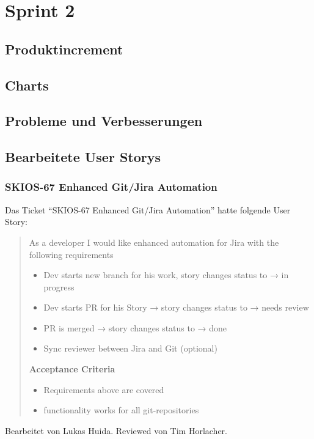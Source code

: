 \section{Sprint 2}
\subsection{Produktincrement}
\subsection{Charts}
\subsection{Probleme und Verbesserungen}


\subsection{Bearbeitete User Storys}

\subsubsection{SKIOS-67 Enhanced Git/Jira Automation}
Das Ticket \enquote{SKIOS-67 Enhanced Git/Jira Automation} hatte folgende User Story:
\begin{quotation}
    As a developer I would like enhanced automation for Jira with the following requirements
    \begin{itemize}
        \item Dev starts new branch for his work, story changes status to → in progress
        \item Dev starts PR for his Story → story changes status to → needs review
        \item PR is merged → story changes status to → done
        \item Sync reviewer between Jira and Git (optional) 
    \end{itemize}

    \textbf{Acceptance Criteria}
    \begin{itemize}
        \item Requirements above are covered
        \item functionality works for all git-repositories
    \end{itemize}
\end{quotation}
Bearbeitet von Lukas Huida.
Reviewed von Tim Horlacher.

